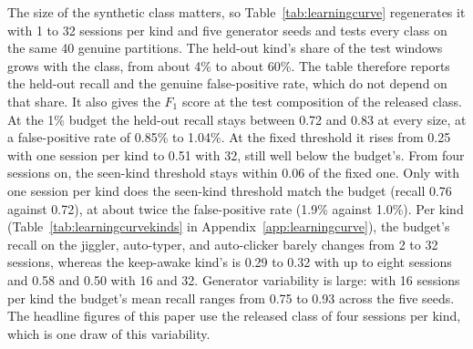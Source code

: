 \documentclass[sensors,article,submit,pdftex,oneauthor]{Definitions/mdpi}
\begin{document}


The size of the synthetic class matters, so Table~\ref{tab:learningcurve} regenerates it with 1 to 32 sessions per kind and five generator seeds and tests every class on the same 40 genuine partitions. The held-out kind's share of the test windows grows with the class, from about 4\% to about 60\%. The table therefore reports the held-out recall and the genuine false-positive rate, which do not depend on that share. It also gives the $F_1$ score at the test composition of the released class. At the 1\% budget the held-out recall stays between 0.72 and 0.83 at every size, at a false-positive rate of 0.85\% to 1.04\%. At the fixed threshold it rises from 0.25 with one session per kind to 0.51 with 32, still well below the budget's. From four sessions on, the seen-kind threshold stays within 0.06 of the fixed one. Only with one session per kind does the seen-kind threshold match the budget (recall 0.76 against 0.72), at about twice the false-positive rate (1.9\% against 1.0\%). Per kind (Table~\ref{tab:learningcurvekinds} in Appendix~\ref{app:learningcurve}), the budget's recall on the jiggler, auto-typer, and auto-clicker barely changes from 2 to 32 sessions, whereas the keep-awake kind's is 0.29 to 0.32 with up to eight sessions and 0.58 and 0.50 with 16 and 32. Generator variability is large: with 16 sessions per kind the budget's mean recall ranges from 0.75 to 0.93 across the five seeds. The headline figures of this paper use the released class of four sessions per kind, which is one draw of this variability.


\end{document}
